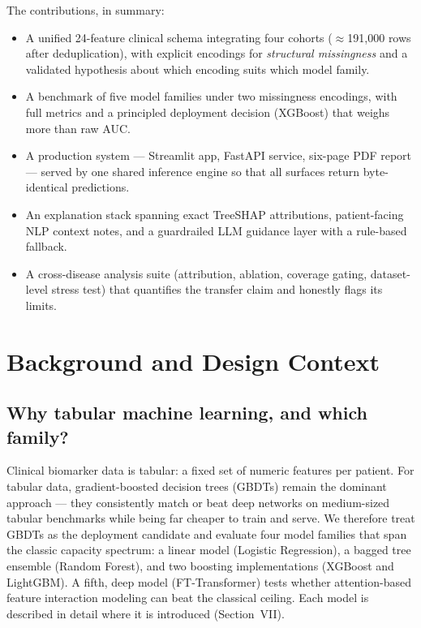 \documentclass[journal]{IEEEtran}
\begin{document}
The contributions, in summary:
\begin{itemize}
    \item A unified 24-feature clinical schema integrating four cohorts ($\approx$191{,}000 rows after deduplication), with explicit encodings for \emph{structural missingness} and a validated hypothesis about which encoding suits which model family.
    \item A benchmark of five model families under two missingness encodings, with full metrics and a principled deployment decision (XGBoost) that weighs more than raw AUC.
    \item A production system --- Streamlit app, FastAPI service, six-page PDF report --- served by one shared inference engine so that all surfaces return byte-identical predictions.
    \item An explanation stack spanning exact TreeSHAP attributions, patient-facing NLP context notes, and a guardrailed LLM guidance layer with a rule-based fallback.
    \item A cross-disease analysis suite (attribution, ablation, coverage gating, dataset-level stress test) that quantifies the transfer claim and honestly flags its limits.
\end{itemize}

\section{Background and Design Context}
\subsection{Why tabular machine learning, and which family?}
Clinical biomarker data is tabular: a fixed set of numeric features per patient. For tabular data, gradient-boosted decision trees (GBDTs) remain the dominant approach --- they consistently match or beat deep networks on medium-sized tabular benchmarks while being far cheaper to train and serve. We therefore treat GBDTs as the deployment candidate and evaluate four model families that span the classic capacity spectrum: a linear model (Logistic Regression), a bagged tree ensemble (Random Forest), and two boosting implementations (XGBoost and LightGBM). A fifth, deep model (FT-Transformer) tests whether attention-based feature interaction modeling can beat the classical ceiling. Each model is described in detail where it is introduced (Section~VII).
\end{document}
